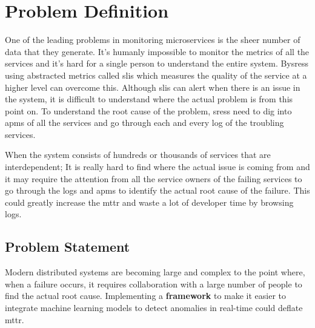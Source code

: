 \section{Problem Definition}

One of the leading problems in monitoring microservices is the sheer number of data that they generate. It's humanly impossible to monitor the metrics of all the services and it's hard for a single person to understand the entire system. By\acp{sres} using abstracted metrics called \acp{sli} which measures the quality of the service at a higher level can overcome this. Although \acp{sli} can alert when there is an issue in the system, it is difficult to understand where the actual problem is from this point on. To understand the root cause of the problem, \acp{sres} need to dig into \acp{apm} of all the services and go through each and every log of the troubling services.

When the system consists of hundreds or thousands of services that are interdependent; It is really hard to find where the actual issue is coming from and it may require the attention from all the service owners of the failing services to go through the logs and \acp{apm} to identify the actual root cause of the failure. This could greatly increase the \ac{mttr} and waste a lot of developer time by browsing logs.

\subsection{Problem Statement}

Modern distributed systems are becoming large and complex to the point where, when a failure occurs, it requires collaboration with a large number of people to find the actual root cause. Implementing a \textbf{framework} to make it easier to integrate machine learning models to detect anomalies in real-time could deflate \ac{mttr}.